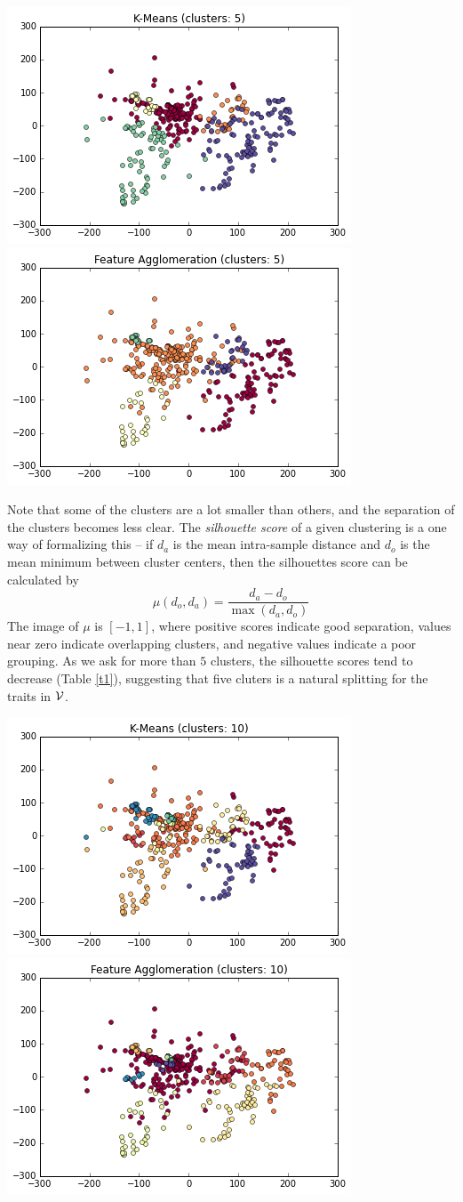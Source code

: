 \documentclass[paper.tex]{subfiles}
\begin{document}
	\includegraphics[width=0.5\linewidth]{images/clusters_km_5.png}
	\includegraphics[width=0.5\linewidth]{images/clusters_fa_5.png}
	
	Note that some of the clusters are a lot smaller than others, and the separation of the clusters becomes less clear. The \textit{silhouette score} of a given clustering is a one way of formalizing this \cite{silhouette} -- if $d_a$ is the mean intra-sample distance and $d_o$ is the mean minimum between cluster centers, then the silhouettes score can be calculated by
	\[ \mu(d_o, d_a) = \frac{d_a - d_o}{\max ( d_a, d_o) }\]
	The image of $\mu$ is $[-1, 1]$, where positive scores indicate good separation, values near zero indicate overlapping clusters, and negative values indicate a poor grouping. As we ask for more than $5$ clusters, the silhouette scores tend to decrease (Table \ref{t1}), suggesting that five cluters is a natural splitting for the traits in $\mathcal{V}$.

	\includegraphics[width=0.5\linewidth]{images/clusters_km_10.png}
	\includegraphics[width=0.5\linewidth]{images/clusters_fa_10.png}
	
\end{document}
